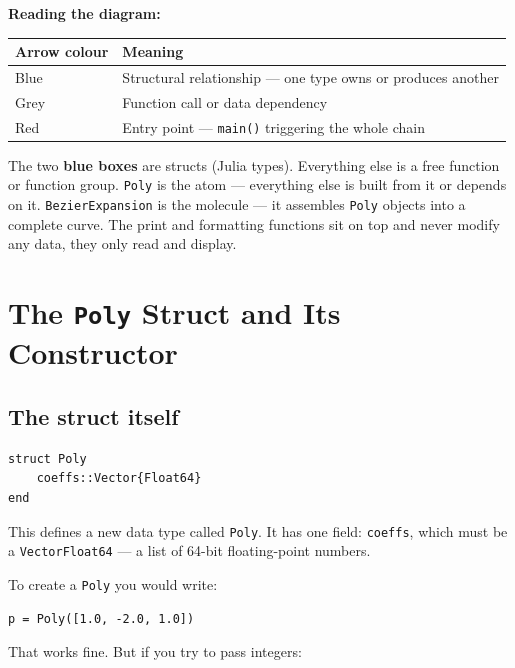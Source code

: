 \documentclass[12pt, a4paper]{article}
\newcommand{\cd}[1]{\texttt{#1}}
\begin{document}
\begin{notebox}
\textbf{Reading the diagram:}

\medskip
\begin{tabular}{lp{10cm}}
\toprule
Arrow colour & Meaning \\
\midrule
Blue  & Structural relationship --- one type owns or produces another \\
Grey  & Function call or data dependency \\
Red   & Entry point --- \texttt{main()} triggering the whole chain \\
\bottomrule
\end{tabular}

\medskip
The two \textbf{blue boxes} are structs (Julia types).
Everything else is a free function or function group.
\texttt{Poly} is the atom --- everything else is built from it
or depends on it.
\texttt{BezierExpansion} is the molecule ---
it assembles \texttt{Poly} objects into a complete curve.
The print and formatting functions sit on top and never modify
any data, they only read and display.
\end{notebox}

\section{The \texttt{Poly} Struct and Its Constructor}

\subsection{The struct itself}

\begin{verbatim}
struct Poly
    coeffs::Vector{Float64}
end
\end{verbatim}

This defines a new data type called \cd{Poly}.
It has one field: \cd{coeffs}, which must be a
\cd{Vector{Float64}} --- a list of 64-bit floating-point numbers.

To create a \cd{Poly} you would write:

\begin{verbatim}
p = Poly([1.0, -2.0, 1.0])
\end{verbatim}

That works fine. But if you try to pass integers:
\end{document}
